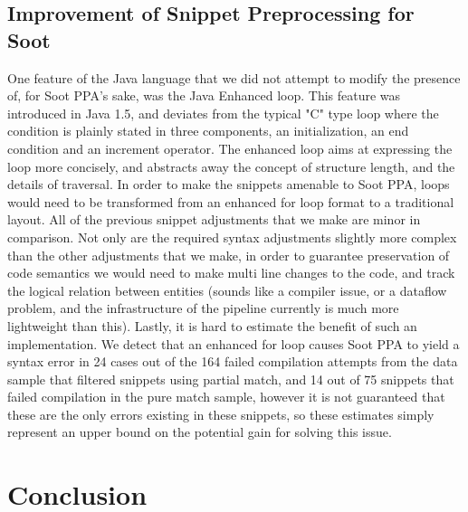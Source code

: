 \documentclass[10pt, conference]{IEEEtran}
\begin{document}
\subsection{Improvement of Snippet Preprocessing for Soot}
One feature of the Java language that we did not attempt to modify the presence of, for Soot PPA's sake, was the Java Enhanced loop. This feature was introduced in Java 1.5, and deviates from the typical "C" type loop where the condition is plainly stated in three components, an initialization, an end condition and an increment operator. The enhanced loop aims at expressing the loop more concisely, and abstracts away the concept of structure length, and the details of traversal. In order to make the snippets amenable to Soot PPA, loops would need to be transformed from an enhanced for loop format to a traditional layout. All of the previous snippet adjustments that we make are minor in comparison. Not only are the required syntax adjustments slightly more complex than the other adjustments that we make, in order to guarantee preservation of code semantics we would need to make multi line changes to the code, and track the logical relation between entities (sounds like a compiler issue, or a dataflow problem, and the infrastructure of the pipeline currently is much more lightweight than this). Lastly, it is hard to estimate the benefit of such an implementation. We detect that an enhanced for loop causes Soot PPA to yield a syntax error in 24 cases out of the 164 failed compilation attempts from the data sample that filtered snippets using partial match, and 14 out of 75 snippets that failed compilation in the pure match sample, however it is not guaranteed that these are the only errors existing in these snippets, so these estimates simply represent an upper bound on the potential gain for solving this issue.

\section{Conclusion}
\end{document}
